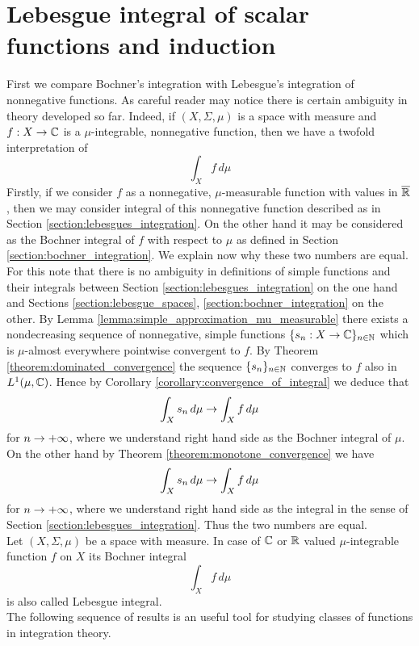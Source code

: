 \section{Lebesgue integral of scalar functions and induction}
\noindent
First we compare Bochner's integration with Lebesgue's integration of nonnegative functions. As careful reader may notice there is certain ambiguity in theory developed so far. Indeed, if $(X,\Sigma,\mu)$ is a space with measure and $f:X\rightarrow {\mathbb C}$ is a $\mu$-integrable, nonnegative function, then we have a twofold interpretation of
$$\int_Xf\,d\mu$$
Firstly, if we consider $f$ as a nonnegative, $\mu$-measurable function with values in $\overline{{\mathbb R}}$, then we may consider integral of this nonnegative function described as in Section \ref{section:lebesgues_integration}. On the other hand it may be considered as the Bochner integral of $f$ with respect to $\mu$ as defined in Section \ref{section:bochner_integration}. We explain now why these two numbers are equal. For this note that there is no ambiguity in definitions of simple functions and their integrals between Section \ref{section:lebesgues_integration} on the one hand and Sections \ref{section:lebesgue_spaces}, \ref{section:bochner_integration} on the other. By Lemma \ref{lemma:simple_approximation_mu_measurable} there exists a nondecreasing sequence of nonnegative, simple functions $\{s_n:X\rightarrow {\mathbb C}\}_{n\in {\mathbb N}}$ which is $\mu$-almost everywhere pointwise convergent to $f$. By Theorem \ref{theorem:dominated_convergence} the sequence $\{s_n\}_{n\in {\mathbb N}}$ converges to $f$ also in $L^1(\mu,{\mathbb C})$. Hence by Corollary \ref{corollary:convergence_of_integral} we deduce that
$$\int_Xs_n\,d\mu\rightarrow \int_Xf\,d\mu$$
for $n\rightarrow +\infty$, where we understand right hand side as the Bochner integral of $\mu$. On the other hand by Theorem \ref{theorem:monotone_convergence} we have
$$\int_Xs_n\,d\mu \rightarrow \int_Xf\,d\mu$$
for $n\rightarrow +\infty$, where we understand right hand side as the integral in the sense of Section \ref{section:lebesgues_integration}. Thus the two numbers are equal.\\
Let $(X,\Sigma, \mu)$ be a space with measure. In case of ${\mathbb C}$ or ${\mathbb R}$ valued $\mu$-integrable function $f$ on $X$ its Bochner integral
$$\int_X f\,d\mu$$
is also called Lebesgue integral.\\
The following sequence of results is an useful tool for studying classes of functions in integration theory.

